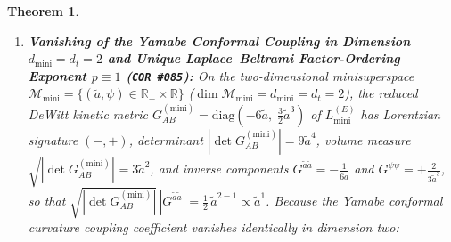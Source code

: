 \documentclass[11pt,a4paper]{article}
\newcommand{\catD}{\text{\textbf{\textcolor{blue!75!black}{[D]}}}}
\theoremstyle{definition}
\theoremstyle{plain}
\newtheorem{theorem}[axiom]{Theorem}
\theoremstyle{remark}
\begin{document}
\begin{theorem}
\begin{enumerate}[label=(\roman*)]
  Evaluating the 5D Jordan-frame action density $\sqrt{|g_5|}[R^{(5)} - 2V(\psi, \mathcal{A})]$ and the 4D Einstein-frame action density $\frac{1}{2}\sqrt{-\tilde{g}_4}[\tilde{R}^{(4)} + \kappa_\psi\tilde{g}^{\mu\nu}\partial_\mu\psi\partial_\nu\psi - 2\mathcal{V}_{\mathrm{spec}}(\psi)]$ on curved-$k$ FLRW metrics with lapse $N(t_1)$ and removing the boundary total time derivative $\frac{d}{dt_1}\sum_q (\partial L/\partial\ddot{q})\dot{q}$ deduces the first-order minisuperspace Lagrangians $L_{\mathrm{mini}}(N, a, \psi, \Theta) = a e^\psi[-6\dot{a}^2/N - 6a\dot{a}\dot{\psi}/N + 6kN - 2a^2 N V(\psi, N^2/\dot{\Theta}^2)]$ and $L_{\mathrm{mini}}^{(E)}(N, \tilde{a}, \psi) = \frac{\tilde{a}^3}{N}(-3\frac{\dot{\tilde{a}}^2}{\tilde{a}^2} - \frac{1}{2}\kappa_\psi\dot{\psi}^2) + 3kN\tilde{a} - N\tilde{a}^3\mathcal{V}_{\mathrm{spec}}(\psi)$. Their Euler--Lagrange expressions $(\mathcal{E}_N, \mathcal{E}_a, \mathcal{E}_\psi, \mathcal{E}_\Theta)$ satisfy the exact off-shell reparametrization identity, and for the lapse constraint $\mathcal{C}_{\mathrm{Fried}} \equiv 3(H^2 + k/a^2 + H\dot{\psi}) - (\rho_r + V(\psi))$ at $N = 1, \sigma = 0$ coupled to a conformally coupled radiation test fluid $\rho_r(t_1)$ satisfying the continuity equation $\dot{\rho}_r + (4H + \dot{\psi})\rho_r = 0$, the constraint satisfies the exact on-shell evolution identity (\texttt{COR~\#085}):
  \begin{align}
  \dot{\Theta}\mathcal{E}_\Theta - N\dot{\mathcal{E}}_N + \dot{a}\mathcal{E}_a + \dot{\psi}\mathcal{E}_\psi &\equiv 0 \quad \textnormal{(\texttt{COR~\#085})} \;\catD, \nonumber \\[3pt]
  \frac{d}{dt_1}\mathcal{C}_{\mathrm{Fried}}(t_1) &\equiv -\left(3H + \dot{\psi}\right)\mathcal{C}_{\mathrm{Fried}}(t_1) \;\;\catD. \label{eq:c5_minisuperspace_noether}
  \end{align}
  \item \textbf{Vanishing of the Yamabe Conformal Coupling in Dimension $d_{\mathrm{mini}} = d_t = 2$ and Unique Laplace--Beltrami Factor-Ordering Exponent $p \equiv 1$ (\texttt{COR~\#085}):}
  On the two-dimensional minisuperspace $\mathcal{M}_{\mathrm{mini}} = \{(\tilde{a}, \psi) \in \mathbb{R}_+ \times \mathbb{R}\}$ ($\dim\mathcal{M}_{\mathrm{mini}} = d_{\mathrm{mini}} = d_t = 2$), the reduced DeWitt kinetic metric $G_{AB}^{(\mathrm{mini})} = \mathrm{diag}(-6\tilde{a},\; \frac{3}{2}\tilde{a}^3)$ of $L_{\mathrm{mini}}^{(E)}$ has Lorentzian signature $(-,+)$, determinant $|\det G_{AB}^{(\mathrm{mini})}| = 9\tilde{a}^4$, volume measure $\sqrt{|\det G_{AB}^{(\mathrm{mini})}|} = 3\tilde{a}^2$, and inverse components $G^{\tilde{a}\tilde{a}} = -\frac{1}{6\tilde{a}}$ and $G^{\psi\psi} = +\frac{2}{3\tilde{a}^3}$, so that $\sqrt{|\det G_{AB}^{(\mathrm{mini})}|}\,|G^{\tilde{a}\tilde{a}}| = \frac{1}{2}\,\tilde{a}^{2-1} \propto \tilde{a}^1$. Because the Yamabe conformal curvature coupling coefficient vanishes identically in dimension two:

\end{enumerate}
\end{theorem}
\end{document}
